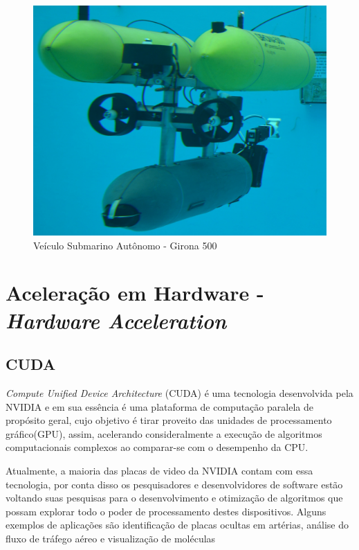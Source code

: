 \begin{figure}[H]
 	\centering
 	\includegraphics[scale=0.1]{./Resources/G500.jpg}
 	\caption{Veículo Submarino Autônomo - Girona 500}
 	\label{G500}
\end{figure}

\section{Aceleração em Hardware - \textit{Hardware Acceleration}}
\subsection{CUDA}

\textit{Compute Unified Device Architecture} (CUDA) é uma tecnologia desenvolvida pela NVIDIA e em sua essência é uma plataforma de computação paralela de propósito geral, cujo objetivo é tirar proveito das unidades de processamento gráfico(GPU), assim, acelerando consideralmente a execução de algoritmos computacionais complexos ao comparar-se com o desempenho da CPU.

Atualmente, a maioria das placas de video da NVIDIA contam com essa tecnologia, por conta disso os pesquisadores e desenvolvidores de software estão voltando suas pesquisas para o desenvolvimento e otimização de algoritmos que possam explorar todo o poder de processamento destes dispositivos. Alguns exemplos de aplicações são identificação de placas ocultas em artérias, análise do fluxo de tráfego aéreo e visualização de moléculas

